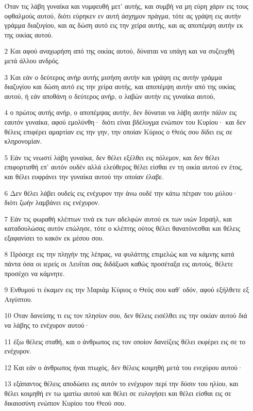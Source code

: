 \par Όταν τις λάβη γυναίκα και νυμφευθή μετ' αυτής, και συμβή να μη εύρη χάριν εις τους οφθαλμούς αυτού, διότι εύρηκεν εν αυτή άσχημον πράγμα, τότε ας γράψη εις αυτήν γράμμα διαζυγίου, και ας δώση αυτό εις την χείρα αυτής, και ας αποπέμψη αυτήν εκ της οικίας αυτού.
\par 2 Και αφού αναχωρήση από της οικίας αυτού, δύναται να υπάγη και να συζευχθή μετά άλλου ανδρός.
\par 3 Και εάν ο δεύτερος ανήρ αυτής μισήση αυτήν και γράψη εις αυτήν γράμμα διαζυγίου και δώση αυτό εις την χείρα αυτής, και αποπέμψη αυτήν από της οικίας αυτού, ή εάν αποθάνη ο δεύτερος ανήρ, ο λαβών αυτήν εις γυναίκα αυτού,
\par 4 ο πρώτος αυτής ανήρ, ο αποπέμψας αυτήν, δεν δύναται να λάβη αυτήν πάλιν εις εαυτόν γυναίκα, αφού εμολύνθη· διότι είναι βδέλυγμα ενώπιον του Κυρίου· και δεν θέλεις επιφέρει αμαρτίαν εις την γην, την οποίαν Κύριος ο Θεός σου δίδει εις σε κληρονομίαν.
\par 5 Εάν τις νεωστί λάβη γυναίκα, δεν θέλει εξέλθει εις πόλεμον, και δεν θέλει επιφορτισθή επ' αυτόν ουδέν αλλά ελεύθερος θέλει είσθαι εν τη οικία αυτού εν έτος, και θέλει ευφράνει την γυναίκα αυτού την οποίαν έλαβε.
\par 6 Δεν θέλει λάβει ουδείς εις ενέχυρον την άνω ουδέ την κάτω πέτραν του μύλου· διότι ζωήν λαμβάνει εις ενέχυρον.
\par 7 Εάν τις φωραθή κλέπτων τινά εκ των αδελφών αυτού εκ των υιών Ισραήλ, και καταδουλώσας αυτόν επώλησε, τότε ο κλέπτης ούτος θέλει θανατόνεσθαι και θέλεις εξαφανίσει το κακόν εκ μέσου σου.
\par 8 Πρόσεχε εις την πληγήν της λέπρας, να φυλάττης επιμελώς και να κάμνης κατά πάντα όσα οι ιερείς οι Λευΐται σας διδάξωσι καθώς προσέταξα εις αυτούς, θέλετε προσέχει να κάμνητε.
\par 9 Ενθυμού τι έκαμεν εις την Μαριάμ Κύριος ο Θεός σου καθ' οδόν, αφού εξήλθετε εξ Αιγύπτου.
\par 10 Όταν δανείσης τι εις τον πλησίον σου, δεν θέλεις εισέλθει εις την οικίαν αυτού διά να λάβης το ενέχυρον αυτού·
\par 11 έξω θέλεις σταθή, και ο άνθρωπος εις τον οποίον δανείζεις θέλει εκφέρει εις σε το ενέχυρον.
\par 12 Και εάν ο άνθρωπος ήναι πτωχός, δεν θέλεις κοιμηθή μετά του ενεχύρου αυτού·
\par 13 εξάπαντος θέλεις αποδώσει εις αυτόν το ενέχυρον περί την δύσιν του ηλίου, και θέλει κοιμηθή εν τω ιματίω αυτού και θέλει σε ευλογήσει και θέλει είσθαι εις σε δικαιοσύνη ενώπιον Κυρίου του Θεού σου.
